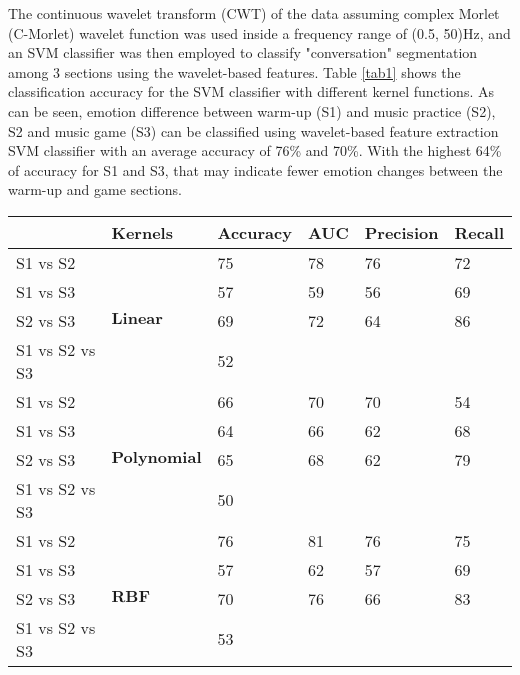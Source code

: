 The continuous wavelet transform (CWT) of the data assuming complex Morlet (C-Morlet) wavelet function
was used inside a frequency range of (0.5, 50)Hz, and an SVM classifier was then employed to classify
"conversation" segmentation among 3 sections using the wavelet-based features. Table \ref{tab1}
shows the classification accuracy for the SVM classifier with different kernel functions. 
As can be seen, emotion difference between warm-up (S1) and music practice (S2), S2 and music game (S3) can be classified using wavelet-based feature extraction SVM classifier with an average accuracy of 76\% and 70\%. With the highest 64\% of accuracy
for S1 and S3, that may indicate fewer emotion changes between the warm-up and game sections. \\

\begin{table*}[tbp]
	\label{tab1}
	\begin{center}
	\caption{Emotion change in different events using wavelet-based feature extraction under SVM classifier. }
	\vspace{3mm}
		\begin{tabular}{llllll}
			& Kernels                     & Accuracy & AUC & Precision & Recall \\
			\hline
			S1 vs S2       & \multirow{4}{*}{\textbf{Linear}}     & 75       & 78  & 76        & 72     \\
			S1 vs S3       &                             & 57       & 59  & 56        & 69     \\
			S2 vs S3       &                             & 69       & 72  & 64        & 86     \\
			S1 vs S2 vs S3 &                             & \multicolumn{4}{l}{52}              \\
			\hline
			S1 vs S2       & \multirow{4}{*}{\textbf{Polynomial}} & 66       & 70  & 70        & 54     \\
			S1 vs S3       &                             & 64       & 66  & 62        & 68     \\
			S2 vs S3       &                             & 65       & 68  & 62        & 79     \\
			S1 vs S2 vs S3 &                             & \multicolumn{4}{l}{50}              \\
			\hline
			S1 vs S2       & \multirow{4}{*}{\textbf{RBF}}        & 76       & 81  & 76        & 75     \\
			S1 vs S3       &                             & 57       & 62  & 57        & 69     \\
			S2 vs S3       &                             & 70       & 76  & 66        & 83     \\
			S1 vs S2 vs S3 &                             & \multicolumn{4}{l}{53}              \\
			\hline
		\end{tabular}
		\label{tab1}
	\end{center}
\end{table*}

